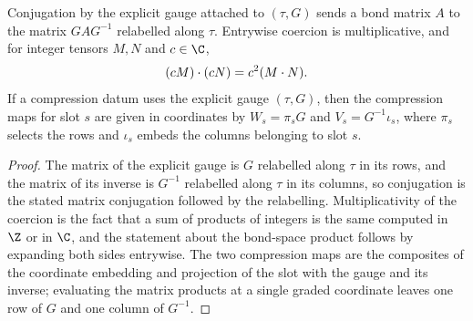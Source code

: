 \begin{lemma}
    \label{thm:asymex_explicit_gauge}
    \leanok
    Conjugation by the explicit gauge attached to $(\tau,G)$ sends a bond
    matrix $A$ to the matrix $GAG^{-1}$ relabelled along $\tau$. Entrywise
    coercion is multiplicative, and for integer tensors $M, N$ and $c \in \C$,
    \begin{align}
        (cM) \mathbin{\cdot} (cN) = c^2 (M \mathbin{\cdot} N). \notag
    \end{align}
    If a compression datum uses the explicit gauge $(\tau,G)$, then the
    compression maps for slot $s$ are given in coordinates by
    $W_s = \pi_s G$ and $V_s = G^{-1} \iota_s$, where $\pi_s$ selects the rows
    and $\iota_s$ embeds the columns belonging to slot $s$.
\end{lemma}

\begin{proof}
    \leanok
    The matrix of the explicit gauge is $G$ relabelled along $\tau$ in its
    rows, and the matrix of its inverse is $G^{-1}$ relabelled along $\tau$
    in its columns, so conjugation is the stated matrix conjugation followed
    by the relabelling. Multiplicativity of the coercion is the fact that a
    sum of products of integers is the same computed in $\Z$ or in $\C$, and
    the statement about the bond-space product follows by expanding both
    sides entrywise. The two compression maps are the composites of the
    coordinate embedding and projection of the slot with the gauge and its
    inverse; evaluating the matrix products at a single graded coordinate
    leaves one row of $G$ and one column of $G^{-1}$.
\end{proof}

